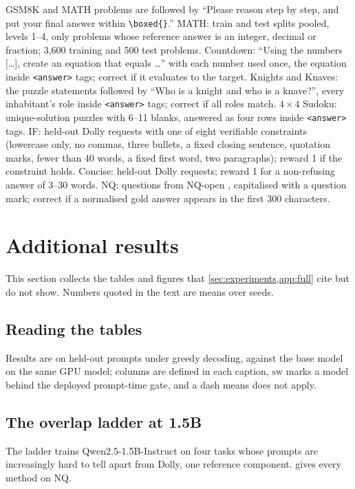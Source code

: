 \documentclass{article}
\theoremstyle{plain}
\theoremstyle{definition}
\theoremstyle{remark}
\begin{document}
GSM8K and MATH problems are followed by ``Please reason step by step, and put your final answer within
\texttt{\textbackslash boxed\{\}}.'' MATH: train and test splits pooled, levels 1--4, only problems whose reference
answer is an integer, decimal or fraction; 3{,}600 training and 500 test problems. Countdown: ``Using the numbers
[\dots], create an equation that equals \dots'' with each number used once, the equation inside \texttt{<answer>} tags;
correct if it evaluates to the target. Knights and Knaves: the puzzle statements followed by ``Who is a knight and who
is a knave?'', every inhabitant's role inside \texttt{<answer>} tags; correct if all roles match. $4\times4$ Sudoku: unique-solution puzzles with 6--11 blanks, answered as four rows inside
\texttt{<answer>} tags. IF: held-out Dolly requests with one of eight verifiable constraints (lowercase only, no
commas, three bullets, a fixed closing sentence, quotation marks, fewer than 40 words, a fixed first word, two
paragraphs); reward 1 if the constraint holds. Concise: held-out Dolly requests; reward 1 for a non-refusing answer
of 3--30 words. NQ: questions from NQ-open \citep{lee2019latent}, capitalised with a question mark; correct if a
normalised gold answer appears in the first 300 characters.

\section{Additional results}
\label{app:results}

This section collects the tables and figures that \cref{sec:experiments,app:full} cite but do not show. Numbers
quoted in the text are means over seeds.

\subsection{Reading the tables}
\label{app:res-read}

Results are on held-out prompts under greedy decoding, against the base model on the same GPU model; columns
are defined in each caption, $\mathrm{sw}$ marks a model behind the deployed prompt-time gate, and a dash means does
not apply.

\subsection{The overlap ladder at 1.5B}
\label{app:res-ladder}

The ladder trains Qwen2.5-1.5B-Instruct on four tasks whose prompts are increasingly hard to tell apart from Dolly, one
reference component.  gives every method on NQ.
\end{document}
